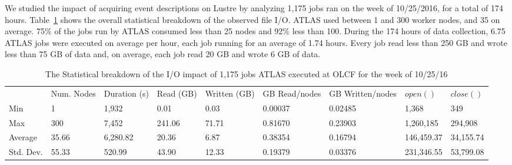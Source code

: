 We studied the impact of acquiring event descriptions on Lustre by analyzing
1,175 jobs ran on the week of 10/25/2016, for a total of 174 hours.
Table~\ref{panda-olcf-stats} shows the overall statistical breakdown of the
observed file I/O. ATLAS used between 1 and 300 worker nodes, and 35 on average.
75\% of the jobs run by ATLAS consumed less than 25 nodes and 92\% less than
100. During the 174 hours of data collection, 6.75 ATLAS jobs were executed on
average per hour, each job running for an average of 1.74 hours. Every job read
less than 250 GB and wrote less than 75 GB of data and, on average, each job
read 20 GB and wrote 6 GB of data.

%
%

\begin{table}[t]
\centering
\begin{tabular}{lllllllll}
 & Num. Nodes & Duration (s) & Read (GB) & Written (GB) & GB Read/nodes & GB Written/nodes & $open()$ & $close()$ \\
Min & 1 & 1,932 & 0.01 & 0.03 & 0.00037 & 0.02485 & 1,368 & 349 \\
Max & 300 & 7,452 & 241.06 & 71.71 & 0.81670 & 0.23903 & 1,260,185 & 294,908 \\
Average & 35.66 & 6,280.82 & 20.36 & 6.87 & 0.38354 & 0.16794 & 146,459.37 & 34,155.74 \\
Std. Dev. & 55.33 & 520.99 & 43.90 & 12.33 & 0.19379 & 0.03376 & 231,346.55 & 53,799.08
\end{tabular}
\caption{The Statistical breakdown of the I/O impact of 1,175 jobs ATLAS executed at OLCF for the week of 10/25/16}
\label{panda-olcf-stats}
\end{table}

%

